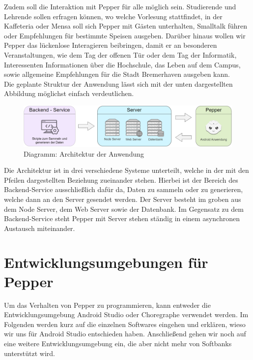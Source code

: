 Zudem soll die Interaktion mit Pepper für alle möglich sein. Studierende und Lehrende sollen erfragen können,
wo welche Vorlesung stattfindet, in der Kaffeteria oder Mensa soll sich Pepper mit Gästen unterhalten, Smalltalk führen oder
Empfehlungen für bestimmte Speisen ausgeben. Darüber hinaus wollen wir Pepper das lückenlose Interagieren beibringen, damit er an
besonderen Veranstaltungen, wie dem Tag der offenen Tür oder dem Tag der Informatik, Interessenten Informationen über die Hochschule,
das Leben auf dem Campus, sowie allgemeine Empfehlungen für die Stadt Bremerhaven ausgeben kann.\\

Die geplante Struktur der Anwendung lässt sich mit der unten dargestellten Abbildung möglichst einfach verdeutlichen. 

\begin{figure}[H]
    \includegraphics[width=\textwidth]{Figures/anwendungarchitektur.png}
    \caption{Diagramm: Architektur der Anwendung}
    \label{fig:integration}
    \centering
\end{figure}

Die Architektur ist in drei verschiedene Systeme unterteilt, welche in der mit den Pfeilen dargestellten Beziehung zueinander stehen. Hierbei ist der Bereich des Backend-Service ausschließlich dafür da, Daten zu sammeln oder zu generieren, welche dann an den Server gesendet werden. Der Server besteht im groben aus dem Node Server, dem Web Server sowie der Datenbank. Im Gegensatz zu dem Backend-Service steht Pepper mit Server stehen ständig in einem asynchronen Austausch miteinander.

\section{Entwicklungsumgebungen für Pepper}

Um das Verhalten von Pepper zu programmieren, kann entweder die Entwicklungsumgebung Android Studio oder Choregraphe verwendet werden. 
Im Folgenden werden kurz auf die einzelnen Softwares eingehen und erklären, wieso wir uns für Android Studio entschieden haben. 
Anschließend gehen wir noch auf eine weitere Entwicklungsumgebung ein, die aber nicht mehr von Softbanks unterstützt wird.\\

